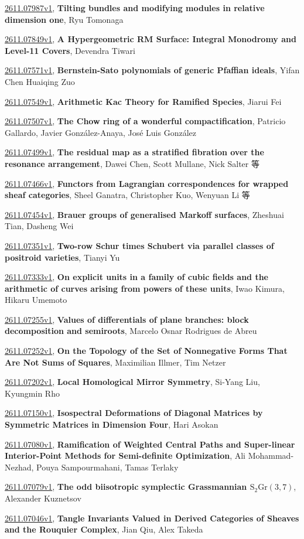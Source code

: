 \documentclass[9pt, a4paper]{article}
\theoremstyle{plain}
\theoremstyle{definition}
\theoremstyle{remark}
\newcommand{\arxiv}[3]{\href{https://arxiv.org/abs/#1}{#1}, \textbf{\textcolor{arxivblue}{#2}}, #3}
\begin{document}
\arxiv{2611.07987v1}{Tilting bundles and modifying modules in relative dimension one}{Ryu Tomonaga}

\arxiv{2611.07849v1}{A Hypergeometric RM Surface: Integral Monodromy and Level-11 Covers}{Devendra Tiwari}

\arxiv{2611.07571v1}{Bernstein-Sato polynomials of generic Pfaffian ideals}{Yifan Chen Huaiqing Zuo}

\arxiv{2611.07549v1}{Arithmetic Kac Theory for Ramified Species}{Jiarui Fei}

\arxiv{2611.07507v1}{The Chow ring of a wonderful compactification}{Patricio Gallardo, Javier González-Anaya, José Luis González}

\arxiv{2611.07499v1}{The residual map as a stratified fibration over the resonance arrangement}{Dawei Chen, Scott Mullane, Nick Salter 等}

\arxiv{2611.07466v1}{Functors from Lagrangian correspondences for wrapped sheaf categories}{Sheel Ganatra, Christopher Kuo, Wenyuan Li 等}

\arxiv{2611.07454v1}{Brauer groups of generalised Markoff surfaces}{Zheshuai Tian, Dasheng Wei}

\arxiv{2611.07351v1}{Two-row Schur times Schubert via parallel classes of positroid varieties}{Tianyi Yu}

\arxiv{2611.07333v1}{On explicit units in a family of cubic fields and the arithmetic of curves arising from powers of these units}{Iwao Kimura, Hikaru Umemoto}

\arxiv{2611.07255v1}{Values of differentials of plane branches: block decomposition and semiroots}{Marcelo Osnar Rodrigues de Abreu}

\arxiv{2611.07252v1}{On the Topology of the Set of Nonnegative Forms That Are Not Sums of Squares}{Maximilian Illmer, Tim Netzer}

\arxiv{2611.07202v1}{Local Homological Mirror Symmetry}{Si-Yang Liu, Kyungmin Rho}

\arxiv{2611.07150v1}{Isospectral Deformations of Diagonal Matrices by Symmetric Matrices in Dimension Four}{Hari Asokan}

\arxiv{2611.07080v1}{Ramification of Weighted Central Paths and Super-linear Interior-Point Methods for Semi-definite Optimization}{Ali Mohammad-Nezhad, Pouya Sampourmahani, Tamas Terlaky}

\arxiv{2611.07079v1}{The odd biisotropic symplectic Grassmannian $\operatorname{S_2Gr}(3,7)$}{Alexander Kuznetsov}

\arxiv{2611.07046v1}{Tangle Invariants Valued in Derived Categories of Sheaves and the Rouquier Complex}{Jian Qiu, Alex Takeda}
\end{document}
